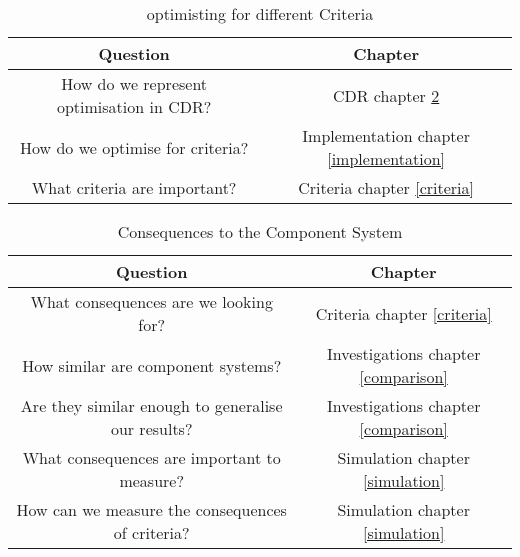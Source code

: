 \documentclass{report}
\begin{document}
{}\begin{table}[h!]
{}\begin{tabular}{|c|c|}
{} Question & Chapter \\ \hline
{}How do we represent optimisation in CDR? & CDR chapter \ref{cdr}\\
{}How do we optimise for criteria? & Implementation chapter \ref{implementation}\\
{}What criteria are important? & Criteria chapter \ref{criteria}
{}\end{tabular}
{}\caption{optimisting for different Criteria}
{}\label{cdr}
{}\end{table}

{}\begin{table}[h!]
{}\begin{tabular}{|c|c|}
{} Question & Chapter \\ \hline
{}What consequences are we looking for? & Criteria chapter \ref{criteria}\\
{}How similar are component systems? & Investigations chapter \ref{comparison}\\
{}Are they similar enough to generalise our results? & Investigations chapter \ref{comparison}\\
{}What consequences are important to measure? & Simulation chapter \ref{simulation}\\
{}How can we measure the consequences of criteria? & Simulation chapter \ref{simulation}
{}\end{tabular}
{}\caption{Consequences to the Component System}
{}\label{cdr}
{}\end{table}
















\end{document}
